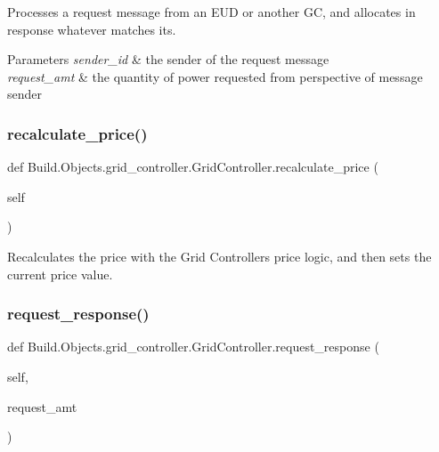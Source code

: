 Processes a request message from an E\+UD or another GC, and allocates in response whatever matches its. 


\begin{DoxyParams}{Parameters}
{\em sender\+\_\+id} & the sender of the request message \\
\hline
{\em request\+\_\+amt} & the quantity of power requested from perspective of message sender \\
\hline
\end{DoxyParams}
\mbox{\label{class_build_1_1_objects_1_1grid__controller_1_1_grid_controller_a59529d68b87e1814512a8c03d908d797}} 
\subsubsection{\texorpdfstring{recalculate\+\_\+price()}{recalculate\_price()}}
{\footnotesize\ttfamily def Build.\+Objects.\+grid\+\_\+controller.\+Grid\+Controller.\+recalculate\+\_\+price (\begin{DoxyParamCaption}\item[{}]{self }\end{DoxyParamCaption})}



Recalculates the price with the Grid Controller\textquotesingle{}s price logic, and then sets the current price value. 

\mbox{\label{class_build_1_1_objects_1_1grid__controller_1_1_grid_controller_ad0475d0ecec8bd9541c940fb5e779dd1}} 
\subsubsection{\texorpdfstring{request\+\_\+response()}{request\_response()}}
{\footnotesize\ttfamily def Build.\+Objects.\+grid\+\_\+controller.\+Grid\+Controller.\+request\+\_\+response (\begin{DoxyParamCaption}\item[{}]{self,  }\item[{}]{request\+\_\+amt }\end{DoxyParamCaption})}



